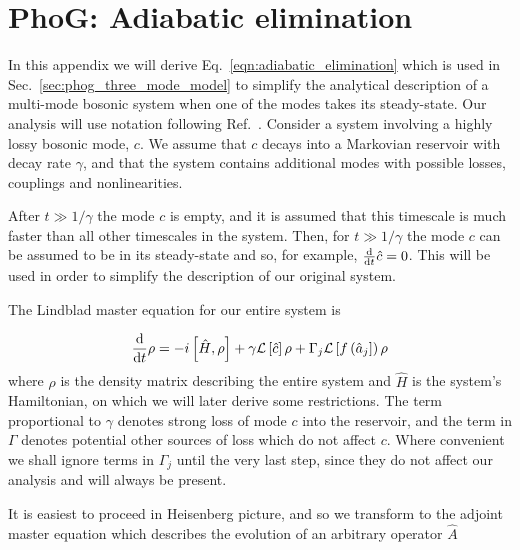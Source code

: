 %
%
%


\chapter{PhoG: Adiabatic elimination}\label{appendix:adiabatic_elimination}

In this appendix we will derive Eq.~\ref{eqn:adiabatic_elimination} which is used in Sec.~\ref{sec:phog_three_mode_model} to simplify the analytical description of a multi-mode bosonic system when one of the modes takes its steady-state. Our analysis will use notation following Ref.~\cite{Shchesnovich2011}. Consider a system involving a highly lossy bosonic mode, $c$. We assume that $c$ decays into a Markovian reservoir with decay rate $\gamma$, and that the system contains additional modes with possible losses, couplings and nonlinearities. 

After $t \gg 1/\gamma$ the mode $c$ is empty, and it is assumed that this timescale is much faster than all other timescales in the system. Then, for $t \gg 1/\gamma$ the mode $c$ can be assumed to be in its steady-state and so, for example, $\frac{\mathrm{d}}{\mathrm{d}t} \hat{c} = 0$. This will be used in order to simplify the description of our original system.

The Lindblad master equation for our entire system is

\begin{equation}
\frac{\mathrm{d}}{\mathrm{d}t} \rho = - i \left[ \hat{H}, \rho \right] + \gamma \mathcal{L}\left[\hat{c}\right] \rho + \Gamma_j\mathcal{L}\left[f\left(\hat{a}_j\right]\right) \rho
\end{equation}
where $\rho$ is the density matrix describing the entire system and $\hat{H}$ is the system's Hamiltonian, on which we will later derive some restrictions. The term proportional to  $\gamma$ denotes strong loss of mode $c$ into the reservoir, and the term in $\Gamma$ denotes potential other sources of loss which do not affect $c$. Where convenient we shall ignore terms in $\Gamma_j$ until the very last step, since they do not affect our analysis and will always be present.

It is easiest to proceed in Heisenberg picture, and so we transform to the adjoint master equation \cite{Breuer2002} which describes the evolution of an arbitrary operator $\hat{A}$

